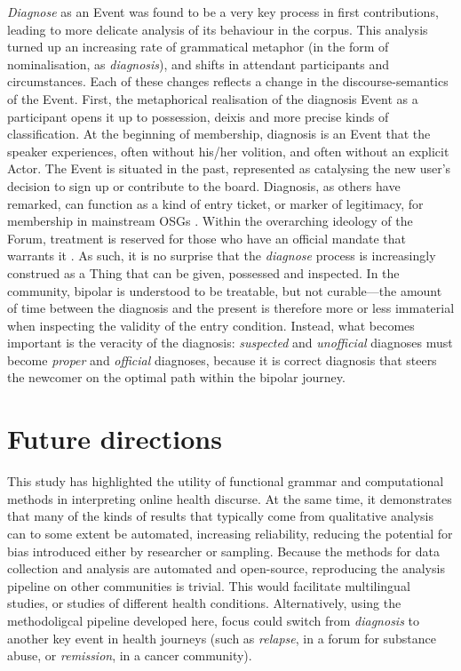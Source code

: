 \documentclass{article}
\renewcommand{\cite}{\parencite}
\begin{document}
\emph{Diagnose} as an Event was found to be a very key process in first contributions, leading to more delicate analysis of its behaviour in the corpus. This analysis turned up an increasing rate of grammatical metaphor (in the form of nominalisation, as \emph{diagnosis}), and shifts in attendant participants and circumstances. Each of these changes reflects a change in the discourse-semantics of the Event. First, the metaphorical realisation of the diagnosis Event as a participant opens it up to possession, deixis and more precise kinds of classification. At the beginning of membership, diagnosis is an Event that the speaker experiences, often without his\slash her volition, and often without an explicit Actor. The Event is situated in the past, represented as catalysing the new user's decision to sign up or contribute to the board. Diagnosis, as others have remarked, can function as a kind of entry ticket, or marker of legitimacy, for membership in mainstream OSGs \cite{stommel_use_2011}. Within the overarching ideology of the Forum, treatment \cite[including the talk therapy provided by Forum interaction itself---see][]{kaufman2016producing} is reserved for those who have an official mandate that warrants it \cite{vayreda_social_2009}. As such, it is no surprise that the \emph{diagnose} process is increasingly construed as a Thing that can be given, possessed and inspected. In the community, bipolar is understood to be treatable, but not curable---the amount of time between the diagnosis and the present is therefore more or less immaterial when inspecting the validity of the entry condition. Instead, what becomes important is the veracity of the diagnosis: \emph{suspected} and \emph{unofficial} diagnoses must become \emph{proper} and \emph{official} diagnoses, because it is correct diagnosis that steers the newcomer on the optimal path within the bipolar journey.

\section{Future directions}

This study has highlighted the utility of functional grammar and computational methods in interpreting online health discurse. At the same time, it demonstrates that many of the kinds of results that typically come from qualitative analysis can to some extent be automated, increasing reliability, reducing the potential for bias introduced either by researcher or sampling. Because the methods for data collection and analysis are automated and open-source, reproducing the analysis pipeline on other communities is trivial. This would facilitate multilingual studies, or studies of different health conditions. Alternatively, using the methodoligcal pipeline developed here, focus could switch from \emph{diagnosis} to another key event in health journeys (such as \emph{relapse}, in a forum for substance abuse, or \emph{remission}, in a cancer community).
\end{document}
